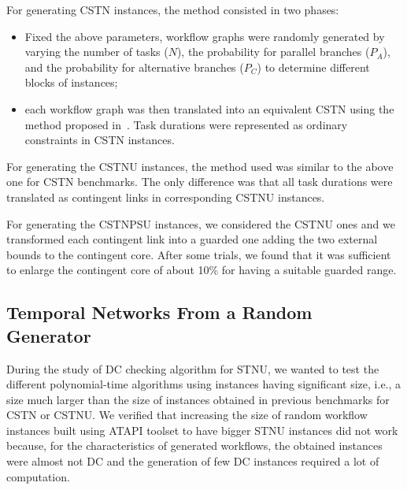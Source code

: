\documentclass[a4paper,11pt]{article}
\begin{document}
For generating CSTN instances, the method consisted in two phases:
\begin{itemize}
\item Fixed the above parameters, workflow graphs were randomly generated by varying the number of tasks ($N$), the probability for parallel branches ($P_A$), and the probability for alternative branches ($P_C$) to determine different blocks of instances;
\item each workflow graph was then translated into an equivalent CSTN using the method proposed in~\cite{CombiGMP14}. Task durations were represented as ordinary constraints in CSTN instances.
\end{itemize}

For generating the CSTNU instances, the method used was similar to the above one for CSTN benchmarks. The only difference was that all task durations were translated as contingent links in corresponding CSTNU instances.

For generating the CSTNPSU instances, we considered the CSTNU ones and we transformed each contingent link into a guarded one adding the two external bounds to the contingent core. After some trials, we found that it was sufficient to enlarge the contingent core of about 10\% for having a suitable guarded range.

\subsection{Temporal Networks From a Random Generator}\label{SECT:STNUGenerator}
During the study of DC checking algorithm for STNU, we wanted to test the different polynomial-time algorithms using instances having significant size, i.e., a size much larger than the size of instances obtained in previous benchmarks for CSTN or CSTNU.
We verified that increasing the size of random workflow instances built using ATAPI toolset to have bigger STNU instances did not work because, for the characteristics of generated workflows, the obtained instances were almost not DC and the generation of few DC instances required a lot of computation.
\end{document}
